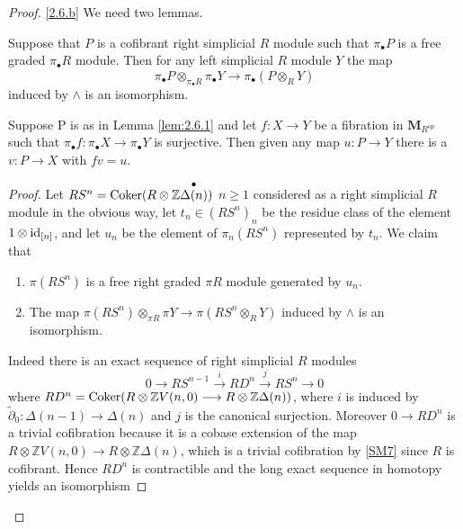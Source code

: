 \documentclass[../main]{subfiles}
\begin{document}
\begin{proof}
\ref{2.6.b} We need two lemmas.
\begin{lemma}\label{lem:2.6.1}
    Suppose that $P$ is a cofibrant right simplicial $R$ module such that $\pi_\bullet P$ is a free graded $\pi_\bullet R$ module. Then for any left simplicial $R$ module $Y$ the map
    \[\pi_\bullet P \otimes_{\pi_\bullet R} \pi_\bullet Y\longrightarrow \pi_\bullet (P\otimes_R Y)\]
    induced by $\wedge$ is an isomorphism.
\end{lemma}
\begin{lemma}\label{lem:2.6.2}
    Suppose P is as in Lemma \ref{lem:2.6.1} and let $f:X\longrightarrow Y$ be a fibration in $\mathbf{M}_{R^{op}}$ such that $\pi_\bullet f:\pi_\bullet X\longrightarrow \pi_\bullet Y$ is surjective. Then given any map $u:P\longrightarrow Y$ there is a $v:P\longrightarrow X$ with $fv=u$.
\end{lemma}
\begin{proof}
Let $RS^n = \operatorname{Coker}(R\otimes \mathbb{Z}\overset{\bullet}{\Delta(n)})$ $n\geq 1$ considered as a right simplicial $R$ module in the obvious way, let $t_n\in (RS^n)_n$ be the residue class of the element $1\otimes \operatorname{id}_{[n]}$, and let $u_n$ be the element of $\pi_n(RS^n)$ represented by $t_n$. We claim that
\begin{enumerate}[label = \Alph*.]
    \item $\pi(RS^n)$ is a free right graded $\pi R$ module generated by $u_n$.
    \item The map $\pi(RS^n)\otimes_{\pi R}\pi Y\longrightarrow \pi(RS^n\otimes_R Y)$ induced by $\wedge$ is an isomorphism.
\end{enumerate}
Indeed there is an exact sequence of right simplicial $R$ modules
\begin{equation}\label{eq:2.6.11}\tag{11}
    0 \longrightarrow  RS^{n-1} \overset{i}{\longrightarrow } RD^{n} \overset{j}{\longrightarrow } RS^{n} \longrightarrow  0
\end{equation}
where $RD^{n} = \operatorname{Coker} (R \otimes \mathbb{Z} V (n, 0) \longrightarrow  R \otimes \mathbb{Z} \Delta (n))$, where $i$ is induced by $\tilde{\partial}_0 \colon \Delta (n-1) \longrightarrow  \Delta (n)$ and $j$ is the canonical surjection. Moreover $0 \longrightarrow  RD^{n}$ is a trivial cofibration because it is a cobase extension of the map \\$R \otimes \mathbb{Z} V(n, 0) \longrightarrow  R \otimes \mathbb{Z} \Delta (n)$, which is a trivial cofibration by \ref{SM7} since $R$ is cofibrant. Hence $RD^{n}$ is contractible and the long exact sequence in homotopy yields an isomorphism

\end{proof}
\end{proof}
\end{document}
